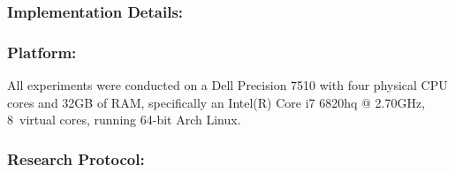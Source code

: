 \documentclass[sigconf,review,anonymous]{acmart}
\newcommand{\approach}{\textsc{BRepair}\xspace}
\newcommand{\brepair}{\textit{BRepair}\xspace}
\begin{document}
\subsubsection*{\bf Implementation Details:}

\subsubsection*{\bf Platform:} All experiments were conducted
on a Dell Precision 7510 with four physical CPU cores %
and 32GB of RAM, specifically an Intel(R) Core i7 6820hq @ 2.70GHz, 8~virtual cores, running 64-bit Arch Linux.


\subsubsection*{\bf Research Protocol:}






\end{document}
